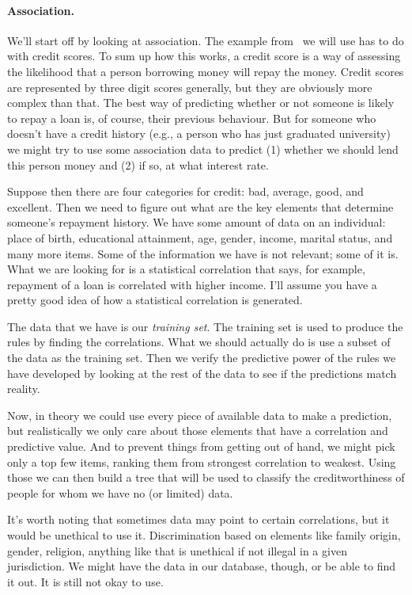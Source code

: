 \paragraph{Association.} We'll start off by looking at association. The example from~\cite{dsc} we will use has to do with credit scores. To sum up how this works, a credit score is a way of assessing the likelihood that a person borrowing money will repay the money. Credit scores are represented by three digit scores generally, but they are obviously more complex than that. The best way of predicting whether or not someone is likely to repay a loan is, of course, their previous behaviour. But for someone who doesn't have a credit history (e.g., a person who has just graduated university) we might try to use some association data to predict (1) whether we should lend this person money and (2) if so, at what interest rate.

Suppose then there are four categories for credit: bad, average, good, and excellent. Then we need to figure out what are the key elements that determine someone's repayment history. We have some amount of data on an individual: place of birth, educational attainment, age, gender, income, marital status, and many more items. Some of the information we have is  not relevant; some of it is. What we are looking for is a statistical correlation that says, for example, repayment of a loan is correlated with higher income. I'll assume you have a pretty good idea of how a statistical correlation is generated.

The data that we have is our \textit{training set}. The training set is used to produce the rules by finding the correlations. What we should actually do is use a subset of the data as the training set. Then we verify the predictive power of the rules we have developed by looking at the rest of the data to see if the predictions match reality.

Now, in theory we could use every piece of available data to make a prediction, but realistically we only care about those elements that have a correlation and predictive value. And to prevent things from getting out of hand, we might pick only a top few items, ranking them from strongest correlation to weakest. Using those we can then build a tree that will be used to classify the creditworthiness of people for whom we have no (or limited) data.

It's worth noting that sometimes data may point to certain correlations, but it would be unethical to use it. Discrimination based on elements like family origin, gender, religion, anything like that is unethical if not illegal in a given jurisdiction. We might have the data in our database, though, or be able to find it out. It is still not okay to use.

